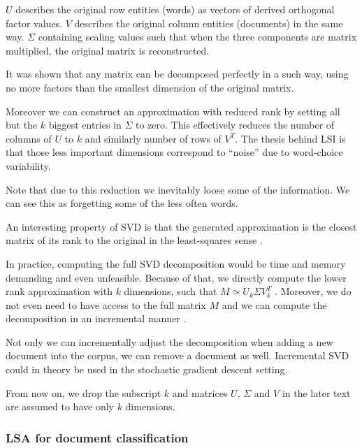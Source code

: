     {}

    $U$ describes the original row entities (words) as vectors of derived orthogonal  factor values. 
    $V$ describes the original column entities (documents) in the same way.
    $\Sigma$ containing scaling values such that when the three components are matrix multiplied, the original matrix is reconstructed.

    It was shown that any matrix can be decomposed perfectly in a such way, using no more factors than the smallest dimension of the original matrix.
    
    Moreover we can construct an approximation with reduced rank by setting all but the $k$ biggest entries in $\Sigma$ to zero. 
    This effectively reduces the number of columns of $U$ to $k$ and similarly number of rows of $V^T$.
    The thesis behind LSI is that those less important dimensions correspond to “noise” due to word-choice variability.
    
    Note that due to this reduction we inevitably loose some of the information. 
    We can see this as forgetting some of the less often words.

    An interesting property of SVD is that the generated approximation is the closest matrix of its rank to the original in the least-squares sense \cite{berry1995using}.

    In practice, computing the full SVD decomposition would be time and memory demanding and even unfeasible.
    Because of that, we directly compute the lower rank approximation with $k$ dimensions,
    such that $M \simeq U_k \Sigma V_k^T$ \cite{halko2011finding}. %
    Moreover, we do not even need to have access to the full matrix $M$ and we can compute the decomposition in an incremental manner \cite{brand2006fast}. %
    
    Not only we can incrementally adjust the decomposition when adding a new document into the corpus, we can remove a document as well.
    Incremental SVD could in theory be used in the stochastic gradient descent setting.
    
    From now on, we drop the subscript $k$ and matrices $U$, $\Sigma$ and $V$ in the later text are assumed to have only $k$ dimensions.
    
    
    \subsubsection{LSA for document classification}
    
